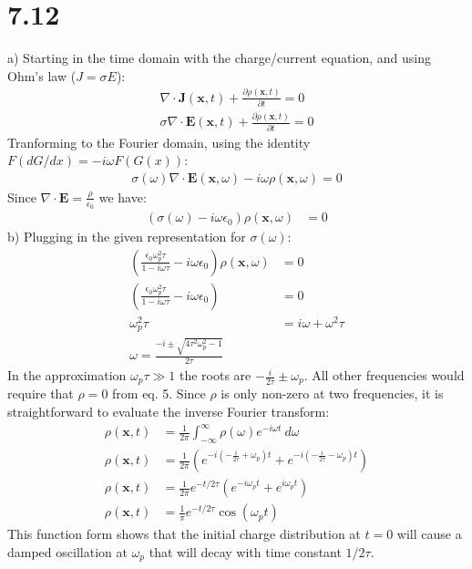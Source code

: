 \documentclass[a4paper,11pt]{article}
\numberwithin{equation}{section}
\newcommand{\bv}[1]{\mathbf{#1}}
\newcommand{\ez}{\epsilon_0}
\newcommand{\lrp}[1]{\left({#1}\right)}
\begin{document}
\section*{7.12}
a) Starting in the time domain with the charge/current equation, and using Ohm's law ($J=\sigma E$):
\begin{align}
 \nabla \cdot \bv{J}(\bv{x},t) + \frac{\partial \rho(\bv{x},t)}{\partial t} = 0\\
 \sigma\nabla \cdot \bv{E}(\bv{x},t) + \frac{\partial \rho(\bv{x},t)}{\partial t} = 0
\end{align}
Tranforming to the Fourier domain, using the identity $F(dG/dx) = -i\omega F(G(x))$:
\begin{align}
 \sigma(\omega) \nabla \cdot \bv{E}(\bv{x},\omega) - i\omega \rho(\bv{x},\omega) = 0
\end{align}
Since $\nabla \cdot \bv{E} = \frac{\rho}{\ez}$ we have:
\begin{align}
 \lrp{\sigma(\omega)-i\omega \ez}\rho(\bv{x},\omega) &= 0
\end{align}
b) Plugging in the given representation for $\sigma(\omega)$:
\begin{align}
 \lrp{\frac{\ez\omega_p^2\tau}{1-i\omega\tau}-i\omega \ez}\rho(\bv{x},\omega) &= 0\\
 \lrp{\frac{\ez\omega_p^2\tau}{1-i\omega\tau}-i\omega \ez} &= 0\\
 \omega_p^2\tau &= i\omega+\omega^2\tau\\
 \omega = \frac{-i \pm \sqrt{4\tau^2\omega_p^2-1}}{2\tau}
\end{align}
In the approximation $\omega_p\tau \gg 1$ the roots are $-\frac{i}{2\tau} \pm \omega_p$.
All other frequencies would require that $\rho=0$ from eq. 5.
Since $\rho$ is only non-zero at two frequencies, it is straightforward to evaluate the inverse Fourier transform:
\begin{align}
 \rho(\bv{x},t) &= \frac{1}{2\pi} \int_{-\infty}^\infty \rho(\omega) e^{-i\omega t}\ d\omega\\
 \rho(\bv{x},t) &= \frac{1}{2\pi} \lrp{e^{-i(-\frac{i}{2\tau} + \omega_p)t}+e^{-i(-\frac{i}{2\tau} - \omega_p)t} }\\
 \rho(\bv{x},t) &= \frac{1}{2\pi} e^{-t/2\tau}\lrp{e^{-i\omega_p t}+e^{i\omega_p t} }\\
 \rho(\bv{x},t) &= \frac{1}{\pi} e^{-t/2\tau} \cos{(\omega_p t)}
\end{align}
This function form shows that the initial charge distribution at $t=0$ will cause a damped oscillation at $\omega_p$ that will decay with time constant $1/2\tau$.
\end{document}
